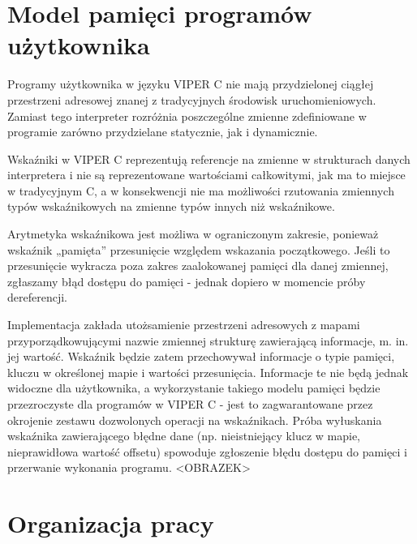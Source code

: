 \documentclass[a4paper,twoside,openright,11pt]{report}
\begin{document}
  \chapter {Model pamięci programów użytkownika}
  \par Programy użytkownika w języku VIPER C nie mają przydzielonej ciągłej przestrzeni adresowej znanej z tradycyjnych środowisk uruchomieniowych. Zamiast tego interpreter rozróżnia poszczególne zmienne zdefiniowane w programie zarówno przydzielane statycznie, jak i dynamicznie. 
  \par Wskaźniki w VIPER C reprezentują referencje na zmienne w strukturach danych interpretera i nie są reprezentowane wartościami całkowitymi, jak ma to miejsce w tradycyjnym C, a w konsekwencji nie ma możliwości rzutowania zmiennych typów wskaźnikowych na zmienne typów innych niż wskaźnikowe. 
  \par Arytmetyka wskaźnikowa jest możliwa w ograniczonym zakresie, ponieważ wskaźnik „pamięta” przesunięcie względem wskazania początkowego. Jeśli to przesunięcie wykracza poza zakres zaalokowanej pamięci dla danej zmiennej, zgłaszamy błąd dostępu do pamięci - jednak dopiero w momencie próby dereferencji. 
  \par Implementacja zakłada utożsamienie przestrzeni adresowych z mapami przyporządkowującymi nazwie zmiennej strukturę zawierającą informacje, m. in. jej wartość. Wskaźnik będzie zatem przechowywał informacje o typie pamięci, kluczu w określonej mapie i wartości przesunięcia. Informacje te nie będą jednak widoczne dla użytkownika, a wykorzystanie takiego modelu pamięci będzie przezroczyste dla programów w VIPER C - jest to zagwarantowane przez okrojenie zestawu dozwolonych operacji na wskaźnikach. Próba wyłuskania wskaźnika zawierającego błędne dane (np. nieistniejący klucz w mapie, nieprawidłowa wartość offsetu) spowoduje zgłoszenie błędu dostępu do pamięci i przerwanie wykonania programu.
  <OBRAZEK>

  \chapter {Organizacja pracy}
\end{document}
